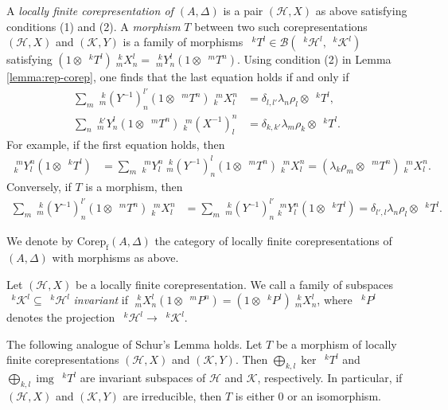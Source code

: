 \documentclass[12pt]{article}
\theoremstyle{change}
\newcommand{\Corep}{\mathrm{Corep_{f}}}
\DeclareMathOperator{\img}{img}
\newcommand{\Gr}[5]{\;{}^{\;#2}_{#4}#1_{#5}^{#3}}%
\newcommand{\Gru}[3]{\;{}^{\;#2}#1^{#3}}
\theoremstyle{definition}
\numberwithin{equation}{section}
\begin{document}
A \emph{locally finite corepresentation of $(A,\Delta)$} is a pair
$(\mathcal{H},X)$ as above satisfying conditions (1) and (2). A
\emph{morphism} $T$ between two such corepresentations
$(\mathcal{H},X)$ and $(\mathcal{K},Y)$ is a family of morphisms
$\Gru{T}{k}{l} \in
\mathcal{B}(\Gru{\mathcal{H}}{k}{l},\Gru{\mathcal{K}}{k}{l})$
satisfying $(1 \otimes \Gru{T}{k}{l})\Gr{X}{k}{l}{m}{n} =
\Gr{Y}{k}{l}{m}{n}(1 \otimes \Gru{T}{m}{n})$.  Using condition (2) in
Lemma \ref{lemma:rep-corep}, one finds that the last equation holds if
and only if
  \begin{align} 
    \sum_{m} \Gr{(Y^{-1})}{k}{l'}{m}{n}(1 \otimes
    \Gru{T}{m}{n})\Gr{X}{m}{n}{k}{l} &= \delta_{l,l'}
    \lambda_{n}\rho_{l} \otimes \Gru{T}{k}{l}, \\
    \sum_{n} \Gr{Y}{k'}{l}{m}{n}(1 \otimes
    \Gru{T}{m}{n})\Gr{(X^{-1})}{m}{n}{k}{l} &= \delta_{k,k'}
    \lambda_{m} \rho_{k} \otimes \Gru{T}{k}{l}.
 \end{align}
For example, if the first equation holds, then
\begin{align*}
  \Gr{Y}{m}{n}{k}{l} (1 \otimes \Gru{T}{k}{l}) &=
  \sum_{m}  \Gr{Y}{m}{n}{k}{l} \Gr{(Y^{-1})}{k}{l}{m}{n}(1 \otimes
  \Gru{T}{m}{n})\Gr{X}{m}{n}{k}{l} = (\lambda_{k}\rho_{m}\otimes \Gru{T}{m}{n})\Gr{X}{m}{n}{k}{l}.
\end{align*}
Conversely, if $T$ is a morphism, then
\begin{align*}
  \sum_{m} \Gr{(Y^{-1})}{k}{l'}{m}{n}(1 \otimes
  \Gru{T}{m}{n})\Gr{X}{m}{n}{k}{l} &= \sum_{m}
  \Gr{(Y^{-1})}{k}{l'}{m}{n} \Gr{Y}{m}{n}{k}{l}(1 \otimes
  \Gru{T}{k}{l}) = \delta_{l',l} \lambda_{n}\rho_{l} \otimes
  \Gru{T}{k}{l}.
\end{align*}

We denote by $\Corep(A,\Delta)$ the category of locally finite
corepresentations of $(A,\Delta)$ with morphisms as above.


Let $(\mathcal{H},X)$ be a locally finite
corepresentation. We call a family of subspaces
$\Gru{\mathcal{K}}{k}{l} \subseteq \Gru{\mathcal{H}}{k}{l}$
\emph{invariant} if $\Gr{X}{k}{l}{m}{n}(1 \otimes \Gru{P}{m}{n}) =
(1\otimes \Gru{P}{k}{l})\Gr{X}{k}{l}{m}{n}$, where $\Gru{P}{k}{l}$
denotes the projection
$\Gru{\mathcal{H}}{k}{l}\to\Gru{\mathcal{K}}{k}{l}$.

The following analogue of Schur's Lemma holds.  Let $T$ be a morphism
of locally finite corepresentations $(\mathcal{H},X)$ and
$(\mathcal{K},Y)$. Then $ \bigoplus_{k,l} \ker \Gru{T}{k}{l}$ and
$\bigoplus_{k,l} \img \Gru{T}{k}{l}$ are invariant subspaces of
$\mathcal{H}$ and $\mathcal{K}$, respectively. In particular, if
$(\mathcal{H},X)$ and $(\mathcal{K},Y)$ are irreducible, then $T$ is
either $0$ or an isomorphism.
\end{document}
